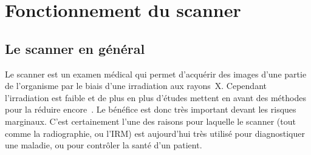 \documentclass[main.tex]{subfiles}
\begin{document}
\section{Fonctionnement du scanner \label{sec:fct_scan}}
\subsection{Le scanner en général}
Le scanner est un examen médical qui permet d'acquérir des images d'une partie de l'organisme par le biais d'une irradiation aux rayons~X. %
Cependant l'irradiation est faible et de plus en plus d'études mettent en avant des méthodes pour la réduire encore~\cite{mccollough2009strategies}. Le bénéfice est donc très important devant les risques marginaux. C'est certainement l'une des raisons pour laquelle le scanner (tout comme la radiographie, ou l'IRM) est aujourd'hui très utilisé pour diagnostiquer une maladie, ou %
pour contrôler la santé d'un patient.
\end{document}
